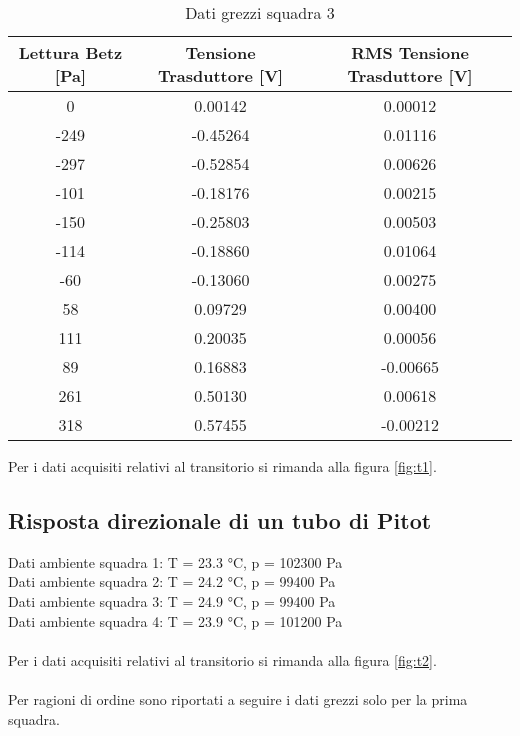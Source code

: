 \begin{table}[h]
\centering
\begin{tabular}{|c|c|c|}
\hline
Lettura Betz {[}Pa{]} & Tensione Trasduttore {[}V{]} & RMS Tensione Trasduttore {[}V{]} \\ \hline
0                     & 0.00142                      & 0.00012                          \\ \hline
-249                  & -0.45264                     & 0.01116                          \\ \hline
-297                  & -0.52854                     & 0.00626                          \\ \hline
-101                  & -0.18176                     & 0.00215                          \\ \hline
-150                  & -0.25803                     & 0.00503                          \\ \hline
-114                  & -0.18860                     & 0.01064                          \\ \hline
-60                   & -0.13060                     & 0.00275                          \\ \hline
58                    & 0.09729                      & 0.00400                          \\ \hline
111                   & 0.20035                      & 0.00056                          \\ \hline
89                    & 0.16883                      & -0.00665                         \\ \hline
261                   & 0.50130                      & 0.00618                          \\ \hline
318                   & 0.57455                      & -0.00212                         \\ \hline
\end{tabular}
\caption{Dati grezzi squadra 3}
\end{table}

\noindent Per i dati acquisiti relativi al transitorio si rimanda alla figura \ref{fig:t1}.

\newpage

\subsection{Risposta direzionale di un tubo di Pitot}\label{a2}
\noindent Dati ambiente squadra 1: T = 23.3 °C, p = 102300 Pa\\
\noindent Dati ambiente squadra 2: T = 24.2 °C, p = 99400 Pa\\
\noindent Dati ambiente squadra 3: T = 24.9 °C, p = 99400 Pa\\
\noindent Dati ambiente squadra 4: T = 23.9 °C, p = 101200 Pa\\\\
Per i dati acquisiti relativi al transitorio si rimanda alla figura \ref{fig:t2}.\\\\
Per ragioni di ordine sono riportati a seguire i dati grezzi solo per la prima squadra.

